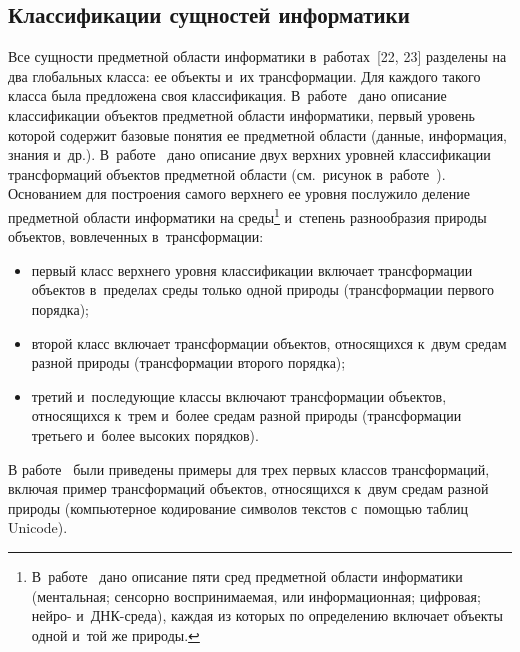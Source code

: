 \begin{multicols}{2}
\section{Классификации сущностей информатики}



  Все сущности предметной области информатики в~работах~[22, 23] 
разделены на два глобальных класса: ее объекты и~их трансформации. Для 
каждого такого класса была предложена своя классификация. 
В~работе~\cite{22-zac} дано описание классификации объектов предметной 
области информатики, первый уровень которой содержит базовые понятия ее 
предметной области (данные, информация, знания и~др.).  
В~работе~\cite{23-zac} дано описание двух верхних уровней классификации 
трансформаций объектов предметной об\-ласти (см.\ рисунок 
в~работе~\cite{23-zac}). Основанием для построения самого верхнего ее уровня послужило деление 
предметной области информатики на среды\footnote{В~работе~\cite{24-zac} дано описание пяти сред 
предметной области информатики (ментальная; сенсорно воспринимаемая, или информационная; 
цифровая; нейро- и~ДНК-среда), каждая из которых по определению включает объекты одной и~той же 
природы.} и~степень разнообразия природы объектов, вовлеченных в~трансформации:
\begin{itemize}
\item  первый класс верхнего уровня классификации включает 
трансформации объектов в~пределах среды только одной природы 
(трансформации первого порядка);
\item  второй класс включает трансформации объектов, относящихся 
к~двум средам разной природы (трансформации второго порядка);
\item третий и~последующие классы включают трансформации объектов, 
относящихся к~трем и~более средам разной природы (трансформации 
третьего и~более высоких порядков).
\end{itemize}

  В работе~\cite{23-zac} были приведены примеры для трех первых классов 
трансформаций, включая пример трансформаций объектов, относящихся 
к~двум средам разной природы (компьютерное кодирование символов текстов 
с~по\-мощью таб\-лиц Unicode).
  

\end{multicols}
